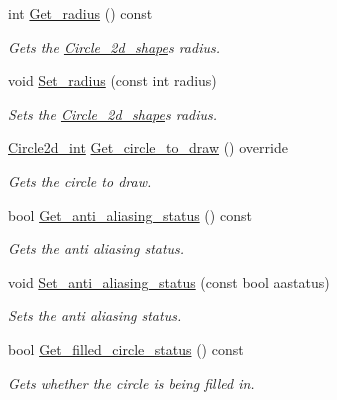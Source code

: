 \begin{DoxyCompactItemize}
int \hyperlink{classjetfuel_1_1draw_1_1Circle__2d__shape_ae3686026f21348b28769d7a89f59c071}{Get\+\_\+radius} () const
\begin{DoxyCompactList}\small\item\em Gets the \hyperlink{classjetfuel_1_1draw_1_1Circle__2d__shape}{Circle\+\_\+2d\+\_\+shape}\textquotesingle{}s radius. \end{DoxyCompactList}\item 
void \hyperlink{classjetfuel_1_1draw_1_1Circle__2d__shape_a100c20cab54eaaafca78147854b0a3c3}{Set\+\_\+radius} (const int radius)
\begin{DoxyCompactList}\small\item\em Sets the \hyperlink{classjetfuel_1_1draw_1_1Circle__2d__shape}{Circle\+\_\+2d\+\_\+shape}\textquotesingle{}s radius. \end{DoxyCompactList}\item 
\hyperlink{classjetfuel_1_1draw_1_1Circle2d}{Circle2d\+\_\+int} \hyperlink{classjetfuel_1_1draw_1_1Circle__2d__shape_ab188ed6716dff22d0498a01ac1e93d90}{Get\+\_\+circle\+\_\+to\+\_\+draw} () override
\begin{DoxyCompactList}\small\item\em Gets the circle to draw. \end{DoxyCompactList}\item 
bool \hyperlink{classjetfuel_1_1draw_1_1Circle__2d__shape_af5e8ebfd4c5102e25263500c0a2075b9}{Get\+\_\+anti\+\_\+aliasing\+\_\+status} () const
\begin{DoxyCompactList}\small\item\em Gets the anti aliasing status. \end{DoxyCompactList}\item 
void \hyperlink{classjetfuel_1_1draw_1_1Circle__2d__shape_a2af81e6479bc9d55b7df7e3c0a392630}{Set\+\_\+anti\+\_\+aliasing\+\_\+status} (const bool aastatus)
\begin{DoxyCompactList}\small\item\em Sets the anti aliasing status. \end{DoxyCompactList}\item 
bool \hyperlink{classjetfuel_1_1draw_1_1Circle__2d__shape_af742bd69519677da00692b9c8b7b0d74}{Get\+\_\+filled\+\_\+circle\+\_\+status} () const
\begin{DoxyCompactList}\small\item\em Gets whether the circle is being filled in. \end{DoxyCompactList}\item 

\end{DoxyCompactItemize}
